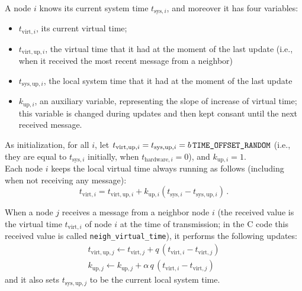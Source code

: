 \documentclass[oneside]{article}
\begin{document}
A node $i$ knows its current system time $t_{\text{sys}, i}$, and moreover it has four variables:
\begin{itemize}
\item $t_{\text{virt}, i}$, its current virtual time;
\item $t_{\text{virt}, \text{up}, i}$, the virtual time that it had at the moment of the last update (i.e., when it received the most recent message from a neighbor)
\item  $t_{\text{sys}, \text{up}, i}$, the local system time that it had at the moment of the last update
\item $k_{\text{up},i}$, an	 auxiliary variable, representing the slope of increase of virtual time; this variable is changed during updates and then kept consant until the next received message.
\end{itemize}


As initialization, for all $i$, let $t_{\text{virt}, \text{up}, i}= t_{\text{sys}, \text{up}, i}= b \, \verb=TIME_OFFSET_RANDOM=  $ (i.e., they are equal to $t_{\text{sys}, i}$ initially, when $t_{\text{hardware}, i} =0$), and  $k_{\text{up},i}=1$. \\

Each node $i$ keeps the local virtual time always running as follows (including when not receiving any message):
\[ %
t_{\text{virt}, i} = t_{\text{virt}, \text{up}, i}
	+ k_{\text{up}, i}(t_{\text{sys},  i} - t_{\text{sys}, \text{up}, i}) \,.
\] %

When a node $j$ receives a message from a neighbor node $i$ (the received value  is the virtual time $t_{\text{virt}, i}$ of node $i$ at the time of transmission; in the C code this received value is called \verb=neigh_virtual_time=), it performs the following updates:
\begin{align*}
t_{\text{virt},\text{up}, j} \leftarrow
	t_{\text{virt}, j}
	+ q \, (t_{\text{virt}, i} - t_{\text{virt}, j})
 \\
k_{\text{up},j} \leftarrow
	k_{\text{up},j}
	+ \alpha \, q \, (t_{\text{virt}, i} - t_{\text{virt}, j})
\end{align*}
and it also sets $t_{\text{sys}, \text{up}, j}$ to be the current local system time.\\
\end{document}
